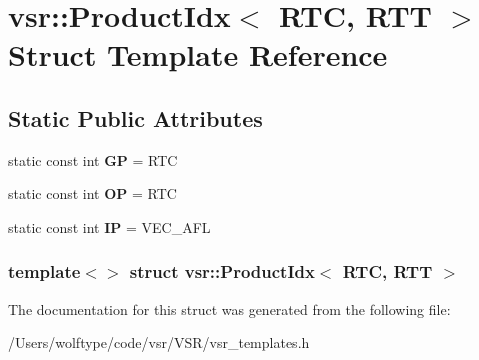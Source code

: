 \hypertarget{structvsr_1_1_product_idx_3_01_r_t_c_00_01_r_t_t_01_4}{\section{vsr\-:\-:Product\-Idx$<$ R\-T\-C, R\-T\-T $>$ Struct Template Reference}
\label{structvsr_1_1_product_idx_3_01_r_t_c_00_01_r_t_t_01_4}
}
\subsection*{Static Public Attributes}
\begin{DoxyCompactItemize}
\item 
\hypertarget{structvsr_1_1_product_idx_3_01_r_t_c_00_01_r_t_t_01_4_a6bfb3885220ce867bfe095b2bad76871}{static const int {\bfseries G\-P} = R\-T\-C}\label{structvsr_1_1_product_idx_3_01_r_t_c_00_01_r_t_t_01_4_a6bfb3885220ce867bfe095b2bad76871}

\item 
\hypertarget{structvsr_1_1_product_idx_3_01_r_t_c_00_01_r_t_t_01_4_aa88fd4fafbd2ee099db0780938c5b1d9}{static const int {\bfseries O\-P} = R\-T\-C}\label{structvsr_1_1_product_idx_3_01_r_t_c_00_01_r_t_t_01_4_aa88fd4fafbd2ee099db0780938c5b1d9}

\item 
\hypertarget{structvsr_1_1_product_idx_3_01_r_t_c_00_01_r_t_t_01_4_a0155f065ee8da6356be3486e0dad939a}{static const int {\bfseries I\-P} = V\-E\-C\-\_\-\-A\-F\-L}\label{structvsr_1_1_product_idx_3_01_r_t_c_00_01_r_t_t_01_4_a0155f065ee8da6356be3486e0dad939a}

\end{DoxyCompactItemize}
\subsubsection*{template$<$$>$ struct vsr\-::\-Product\-Idx$<$ R\-T\-C, R\-T\-T $>$}



The documentation for this struct was generated from the following file\-:\begin{DoxyCompactItemize}
\item 
/\-Users/wolftype/code/vsr/\-V\-S\-R/vsr\-\_\-templates.\-h\end{DoxyCompactItemize}
